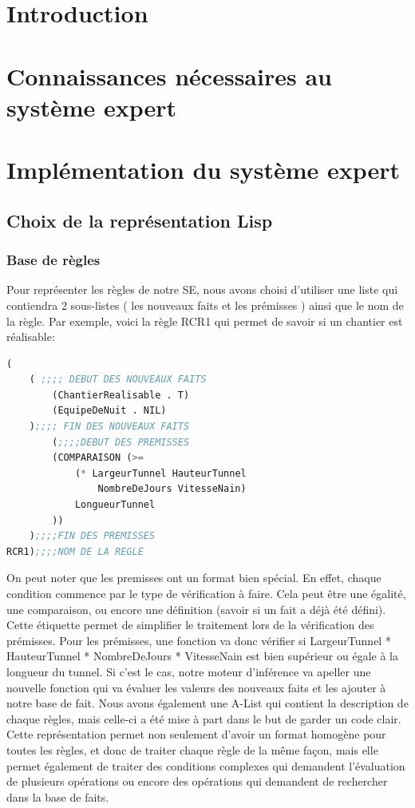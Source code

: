 \documentclass[a4paper,10pt]{report}
\begin{document}
\chapter*{Introduction}
\chapter{Connaissances nécessaires au système expert}
\chapter{Implémentation du système expert}
  \section{Choix de la représentation Lisp}
    \subsection{Base de règles}
    Pour représenter les règles de notre SE, nous avons choisi d'utiliser une liste qui contiendra 2 sous-listes ( les nouveaux faits et les prémisses )
    ainsi que le nom de la règle. Par exemple, voici la règle RCR1 qui permet de savoir si un chantier est réalisable:\newline
    \begin{lstlisting}[language=Lisp]
(
	( ;;;; DEBUT DES NOUVEAUX FAITS
		(ChantierRealisable . T)
		(EquipeDeNuit . NIL)
	);;;; FIN DES NOUVEAUX FAITS
		(;;;;DEBUT DES PREMISSES
		(COMPARAISON (>=
			(* LargeurTunnel HauteurTunnel
			    NombreDeJours VitesseNain)
			LongueurTunnel
		))
	);;;;FIN DES PREMISSES
RCR1);;;;NOM DE LA REGLE

    \end{lstlisting}

    On peut noter que les premisses ont un format bien spécial. En effet, chaque condition commence par le type de vérification à faire. Cela peut être une égalité,
    une comparaison, ou encore une définition (savoir si un fait a déjà été défini). Cette étiquette permet de simplifier le traitement lors de la vérification
    des prémisses. Pour les prémisses, une fonction va donc vérifier si LargeurTunnel * HauteurTunnel * NombreDeJours * VitesseNain est bien supérieur ou égale à la
    longueur du tunnel. Si c'est le cas, notre moteur d'inférence va apeller une nouvelle fonction qui va évaluer les valeurs des nouveaux faits et les ajouter à
    notre base de fait. Nous avons également une A-List qui contient la description de chaque règles, mais celle-ci a été mise à part dans le but de garder un code
    clair. Cette représentation permet non seulement d'avoir un format homogène pour toutes les règles, et donc de traiter chaque règle de la même façon, mais elle
    permet également de traiter des conditions complexes qui demandent l'évaluation de plusieurs opérations ou encore des opérations qui demandent de rechercher
    dans la base de faits.
\end{document}
